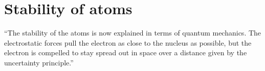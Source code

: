 \section{Stability of atoms}

``The stability of the atoms is now explained in terms of quantum mechanics.
The electrostatic forces pull the electron as close to the nucleus as possible,
but the electron is compelled to stay spread out in space over a distance
given by the uncertainty principle.''


